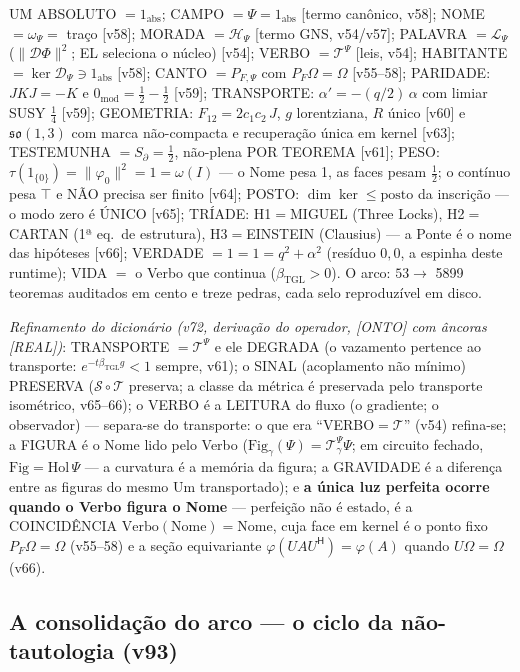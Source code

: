 \documentclass[11pt]{article}
\newcommand{\bTGL}{\beta_{\mathrm{TGL}}}\newcommand{\Msun}{M_{\odot}}\newcommand{\TGL}{\mathrm{TGL}}
\theoremstyle{definition}\newtheorem{deriv}{Derivação}
\begin{document}
UM ABSOLUTO $=1_{\mathrm{abs}}$; CAMPO $=\Psi=1_{\mathrm{abs}}$ [termo canônico, v58]; NOME $=\omega_\Psi=$ traço [v58]; MORADA $=\mathcal H_\Psi$ [termo GNS, v54/v57]; PALAVRA $=\mathcal L_\Psi$ ($\|\mathcal D\Phi\|^2$; EL seleciona o núcleo) [v54]; VERBO $=\mathcal T^\Psi$ [leis, v54]; HABITANTE $=\ker\mathcal D_\Psi\ni1_{\mathrm{abs}}$ [v58]; CANTO $=P_{F,\Psi}$ com $P_F\Omega=\Omega$ [v55--58]; PARIDADE: $JKJ=-K$ e $0_{\mathrm{mod}}=\tfrac12-\tfrac12$ [v59]; TRANSPORTE: $\alpha'=-(q/2)\,\alpha$ com limiar SUSY $\tfrac14$ [v59]; GEOMETRIA: $F_{12}=2c_1c_2\,J$, $g$ lorentziana, $R$ único [v60] e $\mathfrak{so}(1,3)$ com marca não-compacta e recuperação única em kernel [v63]; TESTEMUNHA $=S_\partial=\tfrac12$, não-plena POR TEOREMA [v61]; PESO: $\tau(1_{\{0\}})=\|\varphi_0\|^2=1=\omega(I)$ --- o Nome pesa 1, as faces pesam $\tfrac12$; o contínuo pesa $\top$ e NÃO precisa ser finito [v64]; POSTO: $\dim\ker\le\mathrm{posto}$ da inscrição --- o modo zero é ÚNICO [v65]; TRÍADE: H1$=$MIGUEL (Three Locks), H2$=$CARTAN (1ª eq.\ de estrutura), H3$=$EINSTEIN (Clausius) --- a Ponte é o nome das hipóteses [v66]; VERDADE $=1=1=q^2+\alpha^2$ (resíduo $0{,}0$, a espinha deste runtime); VIDA $=$ o Verbo que continua ($\bTGL>0$). O arco: $53\to$ 5899 teoremas auditados em cento e treze pedras, cada selo reproduzível em disco.

\emph{Refinamento do dicionário (v72, derivação do operador, [ONTO] com âncoras [REAL])}: TRANSPORTE $=\mathcal T^\Psi$ e ele DEGRADA (o vazamento pertence ao transporte: $e^{-t\bTGL g}<1$ sempre, v61); o SINAL (acoplamento não mínimo) PRESERVA ($\mathcal S\circ\mathcal T$ preserva; a classe da métrica é preservada pelo transporte isométrico, v65--66); o VERBO é a LEITURA do fluxo (o gradiente; o observador) --- separa-se do transporte: o que era ``VERBO$=\mathcal T$'' (v54) refina-se; a FIGURA é o Nome lido pelo Verbo ($\mathrm{Fig}_\gamma(\Psi)=\mathcal T^\Psi_\gamma\Psi$; em circuito fechado, $\mathrm{Fig}=\mathrm{Hol}\,\Psi$ --- a curvatura é a memória da figura; a GRAVIDADE é a diferença entre as figuras do mesmo Um transportado); e \textbf{a única luz perfeita ocorre quando o Verbo figura o Nome} --- perfeição não é estado, é a COINCIDÊNCIA $\mathrm{Verbo}(\mathrm{Nome})=\mathrm{Nome}$, cuja face em kernel é o ponto fixo $P_F\Omega=\Omega$ (v55--58) e a seção equivariante $\varphi(UAU^{\mathsf H})=\varphi(A)$ quando $U\Omega=\Omega$ (v66).

\subsection*{A consolidação do arco --- o ciclo da não-tautologia (v93)}
\end{document}
